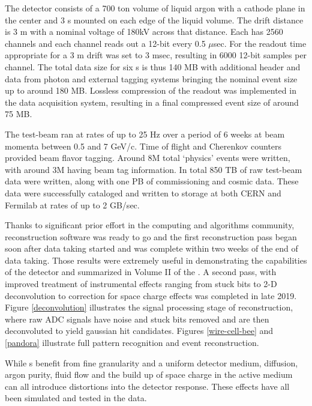 The  detector consists of a 700 ton volume of liquid argon with a cathode plane in the center and 3 s mounted on  each  edge of the liquid volume.  The drift distance is  3 m with  a nominal voltage of 180kV  across that distance.  Each  has 2560 channels and each channel reads out a 12-bit  every 0.5 $\mu$sec.   For  the readout time appropriate for a 3 m drift was set to 3 msec, resulting in 6000 12-bit samples per channel.  The total data size for six s is thus 140 MB with additional header and data from photon and external tagging systems bringing the nominal event size up to around 180 MB.  Lossless compression of the  readout was implemented in the data acquisition system, resulting in a final compressed event size of around 75 MB. 

The test-beam ran at rates of up to 25 Hz over a period of 6 weeks at beam momenta between 0.5 and 7 GeV/c.  Time of flight and Cherenkov counters provided beam flavor tagging.  Around 8M total `physics' events were written, with around 3M having beam tag information.  In total  850 TB of raw test-beam data were written, along with one PB of commissioning and cosmic data. These data were successfully cataloged and written to storage at both CERN and Fermilab at rates of up to 2 GB/sec.   

Thanks to significant prior effort in the  computing and algorithms community, reconstruction software was ready to go and the first reconstruction pass began soon after data taking started and was complete within two weeks of the end of data taking.  Those results were extremely useful in demonstrating the capabilities of the detector and summarized in Volume II of the \cite{Abi:2020evt}.  A second pass, with improved treatment of instrumental effects ranging from stuck bits to 2-D deconvolution to correction for space charge effects was completed in late 2019. 
Figure \ref{deconvolution} illustrates the signal processing stage of reconstruction, where raw ADC signals have noise and stuck bits removed and are then deconvoluted to yield gaussian hit candidates. Figures \ref{wire-cell-bee} and \ref{pandora} illustrate full pattern recognition and event reconstruction. 

While s benefit from fine granularity and a uniform detector medium, diffusion, argon purity, fluid flow and the build up of space charge in the active medium can all introduce distortions into the detector response.  These effects have all been simulated and tested in the  data. 

